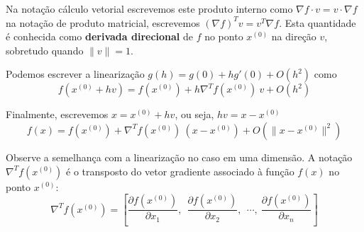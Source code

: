 Na notação cálculo vetorial escrevemos este produto interno como $\nabla f \cdot v = v \cdot \nabla f$ na notação de produto matricial, escrevemos $\left(\nabla f\right)^T v = v^T\nabla f$. Esta quantidade é conhecida como {\bf derivada direcional} de $f$ no ponto $x^{(0)}$ na direção $v$, sobretudo quando $\|v\|=1$.


Podemos escrever a linearização
$g(h)=g(0) + hg'(0) +O(h^2)$ como
$$f(x^{(0)}+hv)=f(x^{(0)})+ h \nabla^T\! f(x^{(0)})\!~v  + O(h^2)$$

Finalmente, escrevemos $x=x^{(0)}+hv$, ou seja, $hv=x-x^{(0)}$
$$f(x)=f(x^{(0)})+ \nabla^T\! f(x^{(0)})\!~(x-x^{(0)})   + O(\|x-x^{(0)}\|^2)$$

\begin{obs} Observe a semelhança com a linearização no caso em uma dimensão. A notação $\nabla^T\! f(x^{(0)})$ é o transposto do vetor gradiente associado à função $f(x)$ no ponto $x^{(0)}$:
$$\nabla^T f(x^{(0)})=\left[\frac{\partial f\left(x^{(0)}\right)}{\partial x_1},~~ \frac{\partial f\left(x^{(0)}\right)}{\partial x_2},~~ \cdots,~\frac{\partial f\left(x^{(0)}\right)}{\partial x_n}\right]$$
\end{obs}

